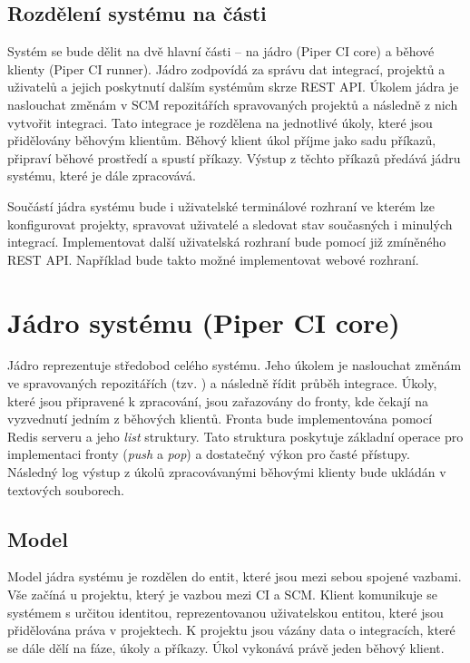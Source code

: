 \subsection{Rozdělení systému na části}

Systém se bude dělit na dvě hlavní části -- na jádro (Piper CI core) a běhové klienty (Piper CI runner).
Jádro zodpovídá za správu dat integrací, projektů a uživatelů a jejich poskytnutí dalším systémům skrze REST API.
Úkolem jádra je naslouchat změnám v SCM repozitářích spravovaných projektů a následně z nich vytvořit integraci.
Tato integrace je rozdělena na jednotlivé úkoly, které jsou přidělovány běhovým klientům.
Běhový klient úkol příjme jako sadu příkazů, připraví běhové prostředí a spustí příkazy.
Výstup z těchto příkazů předává jádru systému, které je dále zpracovává.


Součástí jádra systému bude i uživatelské terminálové rozhraní ve kterém lze konfigurovat projekty, spravovat uživatelé a sledovat stav současných i minulých integrací.
Implementovat další uživatelská rozhraní bude pomocí již zmíněného REST API.
Například bude takto možné implementovat webové rozhraní.

\section{Jádro systému (Piper CI core)}

Jádro reprezentuje středobod celého systému.
Jeho úkolem je naslouchat změnám ve spravovaných repozitářích (tzv. ) a následně řídit průběh integrace.
Úkoly, které jsou připravené k zpracování, jsou zařazovány do fronty, kde čekají na vyzvednutí jedním z běhových klientů.
Fronta bude implementována pomocí Redis serveru a jeho \textit{list} struktury.
Tato struktura poskytuje základní operace pro implementaci fronty (\textit{push} a \textit{pop}) a dostatečný výkon pro časté přístupy.
Následný log výstup z úkolů zpracovávanými běhovými klienty bude ukládán v textových souborech.

\subsection{Model}

Model jádra systému je rozdělen do entit, které jsou mezi sebou spojené vazbami.
Vše začíná u projektu, který je vazbou mezi CI a SCM.
Klient komunikuje se systémem s určitou identitou, reprezentovanou uživatelskou entitou, které jsou přidělována práva v projektech.
K projektu jsou vázány data o integracích, které se dále dělí na fáze, úkoly a příkazy.
Úkol vykonává právě jeden běhový klient.

